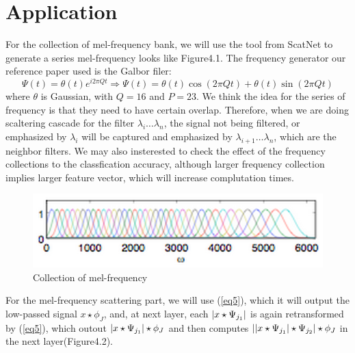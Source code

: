 \documentclass[final]{siamltexmm}
\begin{document}
\section{Application}
For the collection of mel-frequency bank, we will use the tool from ScatNet to generate a series mel-frequency looks like Figure4.1.  The frequency generator our reference paper used is the Galbor filer:
\begin{equation}
\Psi(t)=\theta(t)e^{i2\pi Qt} \Rightarrow \Psi(t)=\theta(t)\cos(2\pi Qt) + \theta(t)\sin(2\pi Qt)\label{eq6}
\end{equation}
where $\theta$ is Gaussian, with $Q=16$ and $P=23$.  We think the idea for the series of frequency is that they need to have certain overlap. Therefore, when we are doing scaltering cascade for the filter $\lambda_{i} \dots \lambda_{n}$,  the signal not being filtered, or emphasized by $\lambda_{i}$ will be captured and emphasized by $\lambda_{i+1} \dots \lambda_{n}$, which are the neighbor filters. We may also insterested to check the effect of the frequency collections to the classfication accuracy, although larger frequency collection implies larger feature vector, which will increase complutation times.
\begin{figure}[ht]
\begin{center}
  \includegraphics[scale=0.8]{Figure2.png}
  \caption{Collection of mel-frequency}
\end{center}
\end{figure}
For the mel-frequency scattering part, we will use (\ref{eq5}), which it will output the low-passed signal $x \star \phi_{J}$, and, at next layer, each $\arrowvert x \star \Psi_{j_{1}} \arrowvert$ is again retransformed by (\ref{eq5}), which outout $\arrowvert x \star \Psi_{j_{1}} \arrowvert \star \phi_{J}$ and then computes $\arrowvert \arrowvert x \star \Psi_{j_{1}} \arrowvert \star \Psi_{j_{2}} \arrowvert \star \phi_{J}$ in the next layer(Figure4.2).
\end{document}
